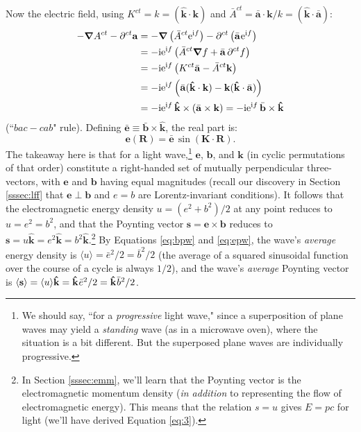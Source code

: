 \documentclass[12pt]{article}
\renewcommand{\vv}[1]{\mathbf{#1}}
\newcommand{\del}{\boldsymbol{\nabla}}
\begin{document}
Now the electric field, using $K^{ct} = k = (\vv{\hat{k}} \cdot \vv k)$ and $\bar{A}^{ct} = \bar{\vv a} \cdot \vv k / k = (\vv{\hat{k}} \cdot \bar{\vv a} )$:
\begin{equation*}
\begin{aligned}
- \del A^{ct} - \partial^{ct} \vv a &= - \del \left( \bar{A}^{ct} \mathrm{e}^{\mathrm{i} f} \right) - \partial^{ct} \left( \bar{\vv a} \mkern1mu \mathrm{e}^{\mathrm{i} f} \right) \\
&= - \mathrm{i} \mathrm{e}^{\mathrm{i} f} \left( \bar{A}^{ct} \del f + \bar{\vv a} \, \partial^{ct} f \right) \\
&= - \mathrm{i} \mathrm{e}^{\mathrm{i} f} \left( K^{ct} \bar{\vv a} - \bar{A}^{ct} \vv k \right) \\[1pt]
&= - \mathrm{i} \mathrm{e}^{\mathrm{i} f} \left( \bar{\vv a} (\vv{\hat{k}} \cdot \vv k )  - \vv k (\vv{\hat{k}} \cdot \bar{\vv a} ) \right) \\[1pt]
&= - \mathrm{i} \mathrm{e}^{\mathrm{i} f} \, \vv{\hat{k}} \times (\bar{\vv a} \times \vv k) = - \mathrm{i} \mathrm{e}^{\mathrm{i} f} \, \bar{\vv b} \times \vv{\hat{k}}
\end{aligned}
\end{equation*}
(``$bac - cab$" rule). Defining $\bar{\vv e} \equiv \bar{\vv b} \times \vv{\hat{k}}$, the real part is:
\begin{equation}\label{eq:epw}
\vv e (\vv R) = \bar{\vv e} \, \sin \left( \vv K \cdot \vv R \right) .
\end{equation}
The takeaway here is that for a light wave,\footnote{We should say, ``for a \emph{progressive} light wave," since a superposition of plane waves may yield a \emph{standing} wave (as in a microwave oven), where the situation is a bit different. But the superposed plane waves are individually progressive.} $\vv e$, $\vv b$, and $\vv k$ (in cyclic permutations of that order) constitute a right-handed set of mutually perpendicular three-vectors, with $\vv e$ and $\vv b$ having equal magnitudes (recall our discovery in Section \ref{sssec:lff} that $\vv e \perp \vv b$ and $e = b$ are Lorentz-invariant conditions). It follows that the electromagnetic energy density $u = (e^2 + b^2) / 2$ at any point reduces to $u = e^2 = b^2$, and that the Poynting vector $\vv s = \vv e \times \vv b$ reduces to $\vv s = u \vv{\hat{k}} = e^2 \vv{\hat{k}} = b^2 \vv{\hat{k}}$.\footnote{\label{fn:epc}In Section \ref{sssec:emm}, we'll learn that the Poynting vector is the electromagnetic momentum density (\emph{in addition} to representing the flow of electromagnetic energy). This means that the relation $s = u$ gives $E = pc$ for light (we'll have derived Equation \ref{eq:3}).} By Equations \ref{eq:bpw} and \ref{eq:epw}, the wave's \emph{average} energy density is $\langle u \rangle = \bar{e}^2 / 2 = \bar{b}^2 / 2$ (the average of a squared sinusoidal function over the course of a cycle is always $1/2$), and the wave's \emph{average} Poynting vector is $\langle \vv s \rangle = \langle u \rangle \vv{\hat{k}} = \vv{\hat{k}} \mkern1mu \bar{e}^2 / 2 = \vv{\hat{k}} \mkern1mu \bar{b}^2 / 2$.
\end{document}
